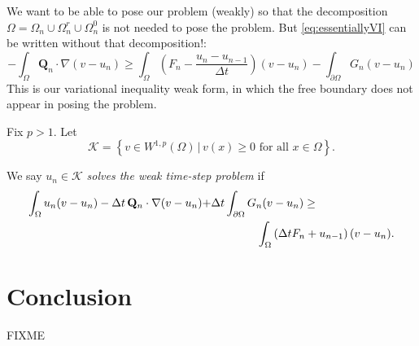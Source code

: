 \documentclass[final,leqno,onefignum,onetabnum]{siamltex1213bueler}
\newcommand\bQ{\mathbf{Q}}
\renewcommand{\grad}{\nabla}
\begin{document}
We want to be able to pose our problem (weakly) so that the decomposition $\Omega = \Omega_n \cup \Omega_n^r \cup \Omega_n^0$ is not needed to pose the problem.  But \eqref{eq:essentiallyVI} can be written without that decomposition!:
\begin{equation}
-\int_{\Omega} \bQ_n \cdot \grad(v-u_n) \ge \int_{\Omega} \left(F_n - \frac{u_n - u_{n-1}}{\Delta t}\right) (v-u_n) - \int_{\partial \Omega} G_n (v-u_n) \label{eq:morallytheVI}
\end{equation}
This is our variational inequality weak form, in which the free boundary does not appear in posing the problem.

\begin{definition}  Fix $p>1$.  Let
    $$\mathcal{K} = \left\{v \in W^{1,p}(\Omega) \,\big|\, v(x) \ge 0 \text{ for all } x \in \Omega\right\}.$$
\end{definition}

\begin{definition}  We say $u_n \in \mathcal{K}$ \emph{solves the weak time-step problem} if 
\begin{align}
\int_{\Omega} u_n (v-u_n) - \Delta t\, \bQ_n \cdot \grad(v-u_n) + &\Delta t \int_{\partial \Omega} G_n (v-u_n) \ge \label{eq:theVI} \\
  &\qquad\qquad \int_{\Omega} \left(\Delta t F_n + u_{n-1}\right) (v-u_n). \notag
\end{align}
\end{definition}




\section{Conclusion}  FIXME





\end{document}
